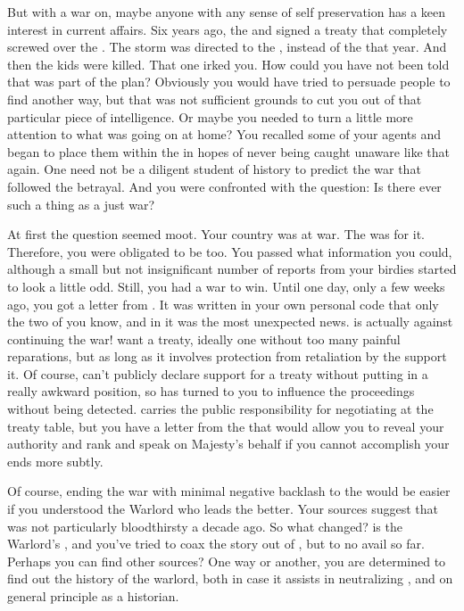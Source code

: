 \documentclass[char]{GL2020}
\begin{document}
But with a war on, maybe anyone with any sense of self preservation has a keen interest in current affairs. Six years ago, the \pFarm{} and \pTech{} signed a treaty that completely screwed over the \pShippies{}. The storm was directed to the \pShip{}, instead of the \pTech{} that year. And then the kids were killed. That one irked you. How could you have not been told that was part of the plan? Obviously you would have tried to persuade people to find another way, but that was not sufficient grounds to cut you out of that particular piece of intelligence. Or maybe you needed to turn a little more attention to what was going on at home? You recalled some of your agents and began to place them within the \pFarm{} in hopes of never being caught unaware like that again. One need not be a diligent student of history to predict the war that followed the betrayal. And you were confronted with the question: Is there ever such a thing as a just war?

At first the question seemed moot. Your country was at war. The \cQueen{\Majesty} was for it. Therefore, you were obligated to be too. You passed what information you could, although a small but not insignificant number of reports from your birdies started to look a little odd. Still, you had a war to win. Until one day, only a few weeks ago, you got a letter from \cQueen{} \cQueen{\themself}. It was written in your own personal code that only the two of you know, and in it was the most unexpected news. \cQueen{} is actually against continuing the war! \cQueen{\They} want a treaty, ideally one without too many painful reparations, but as long as it involves protection from retaliation by the \pTech{} \cQueen{\they} support it. Of course, \cQueen{} can’t publicly declare \cQueen{\their} support for a treaty without putting \pFarm{} in a really awkward position, so \cQueen{\they} has turned to you to influence the proceedings without being detected. \cEvil{} carries the public responsibility for negotiating at the treaty table, but you have a letter from the \cQueen{\Majesty} that would allow you to reveal your authority and rank and speak on \cQueen{\their} Majesty’s behalf if you cannot accomplish your ends more subtly.

Of course, ending the war with minimal negative backlash to the \pFarm{} would be easier if you understood the Warlord who leads the \pShip{} better. Your sources suggest that \cLoud{\full} was not particularly bloodthirsty a decade ago. So what changed? \cWarlordDaughter{} is the Warlord’s \cWarlordDaughter{\child}, and you’ve tried to coax the story out of \cWarlordDaughter{\them}, but to no avail so far. Perhaps you can find other sources? One way or another, you are determined to find out the history of the warlord, both in case it assists in neutralizing \cLoud{\them}, and on general principle as a historian.
\end{document}
